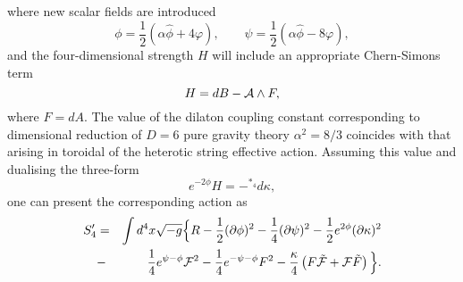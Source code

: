 \documentclass[a4paper,12pt]{article}
\begin{document}
where new scalar fields are introduced
\begin{equation}
\phi = \frac12 (\alpha \hat\phi + 4 \varphi), \qquad \psi =
\frac12 (\alpha \hat\phi - 8 \varphi),
\end{equation}
and the four-dimensional strength $H$ will include an appropriate
Chern-Simons term
\begin{equation}
H = d B - {\cal A} \wedge F,
\end{equation}
where $F = d A$. The value of the dilaton coupling constant
corresponding to dimensional reduction of $D=6$ pure gravity
theory $\alpha^2=8/3$ coincides with that arising in toroidal
of the heterotic string effective action. Assuming this value
and dualising the three-form
\begin{equation}
e^{-2\phi} H = -{}^{*_4} d \kappa,
\end{equation}
one can present the corresponding action as
\begin{eqnarray}\label{S4'}
S_{4}' &=& \int d^4x \sqrt{-g} \Big\{ R - \frac12 (\partial
\phi)^2 - \frac14 (\partial \psi)^2 - \frac12 e^{2\phi} (\partial
\kappa)^2 \nonumber \\
&-& \frac14 e^{\psi-\phi}{\cal F}^2 - \frac14 e^{-\psi-\phi}F^2 -
\frac{\kappa}4\left( F{\tilde {\cal F}} + {\cal F}{\tilde F}
\right) \Big\}. \label{S4}
\end{eqnarray}
\end{document}
